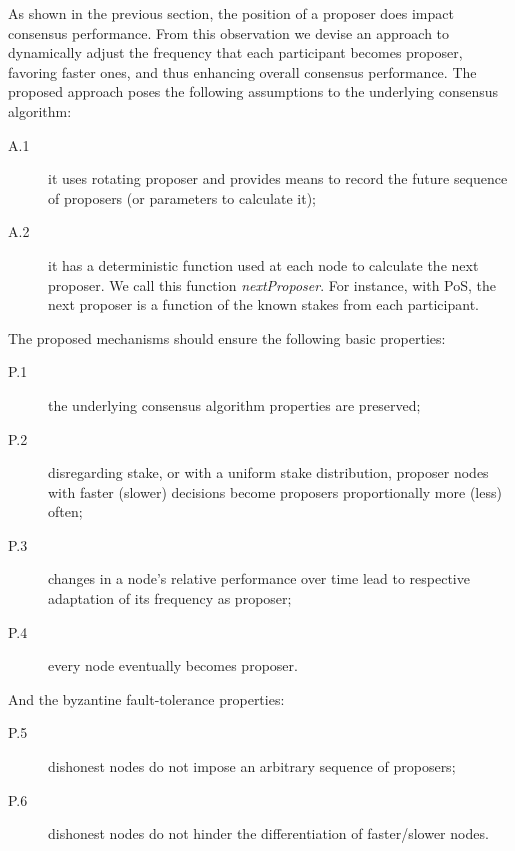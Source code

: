As shown in the previous section, the position of a proposer does impact consensus performance. From this observation we devise an approach to dynamically adjust the frequency that each participant becomes proposer, favoring faster ones, and thus enhancing overall consensus performance. The proposed approach poses the following assumptions to the underlying consensus algorithm:  
\begin{description}
    \item[A.1] it uses rotating proposer and provides means to record the future sequence of proposers (or parameters to calculate it); 
    \item[A.2] it has a deterministic function used at each node to calculate the next proposer.   We call this function \textit{nextProposer}.  For instance, with PoS, the next proposer is a function of the known stakes from each participant. 
\end{description}

The proposed mechanisms should ensure the following basic properties:
\begin{description} 

    \item[P.1] the underlying consensus algorithm properties are preserved;     

    \item[P.2] disregarding stake, or with a uniform stake distribution, proposer nodes with faster (slower) decisions become proposers proportionally more (less) often;

    \item[P.3] changes in a node's relative performance over time lead to respective adaptation of its frequency as proposer;  

    \item[P.4] every node eventually becomes proposer.
\end{description}

And the byzantine fault-tolerance properties:
\begin{description} 
   
    \item[P.5] dishonest nodes do not impose an arbitrary sequence of proposers;
    
    \item[P.6] dishonest nodes do not hinder the differentiation of faster/slower nodes. 

\end{description}


